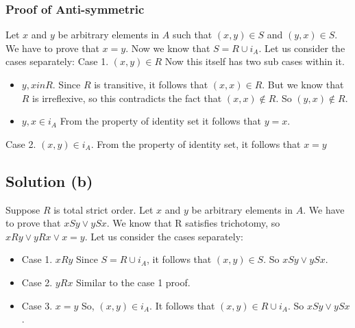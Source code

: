 \documentclass{article}
\begin{document}
\subsubsection{Proof of Anti-symmetric}
Let $x$ and $y$ be arbitrary elements in $A$ such that $(x,y) \in S$
and $(y,x) \in S$. We have to prove that $x = y$. Now we know
that $S = R \cup i_A$. Let us consider the cases separately:
Case 1. $(x,y) \in R$ Now this itself has two sub cases within it.
\begin{itemize}
\item $y,x in R$. Since $R$ is transitive, it follows that $(x,x) \in
  R$. But we know that $R$ is irreflexive, so this contradicts the
  fact that $(x,x) \notin R$. So $(y,x) \notin R$.
\item $y,x \in i_A$ From the property of identity set it follows that
  $y = x$. 
\end{itemize}
Case 2. $(x,y) \in i_A$. From the property of identity set, it follows
that $x = y$

\subsection{Solution (b)}
Suppose $R$ is total strict order. Let $x$ and $y$ be arbitrary
elements in $A$. We have to prove that $xSy \lor ySx$. We know that R
satisfies trichotomy, so $xRy \lor yRx \lor x = y$. Let us consider
the cases separately:
\begin{itemize}
\item Case 1. $xRy$ Since $S = R \cup i_A$, it follows that $(x,y) \in
  S$. So $xSy \lor ySx$.
\item Case 2. $yRx$ Similar to the case 1 proof.
\item Case 3. $x = y$ So, $(x,y) \in i_A$. It follows that $(x,y) \in
  R \cup i_A$. So $xSy \lor ySx$.
\end{itemize}
\end{document}
